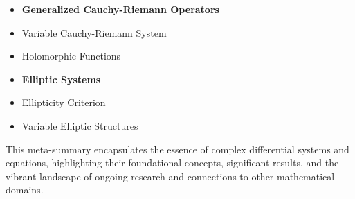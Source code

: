 \documentclass[11pt,a4paper]{article}
\begin{document}
\begin{itemize}
\item \textbf{Generalized Cauchy-Riemann Operators}
\item Variable Cauchy-Riemann System
\item Holomorphic Functions
\end{itemize}

\begin{itemize}
\item \textbf{Elliptic Systems}
\item Ellipticity Criterion
\item Variable Elliptic Structures
\end{itemize}

This meta-summary encapsulates the essence of complex differential systems and equations, highlighting their foundational concepts, significant results, and the vibrant landscape of ongoing research and connections to other mathematical domains.
\end{document}
